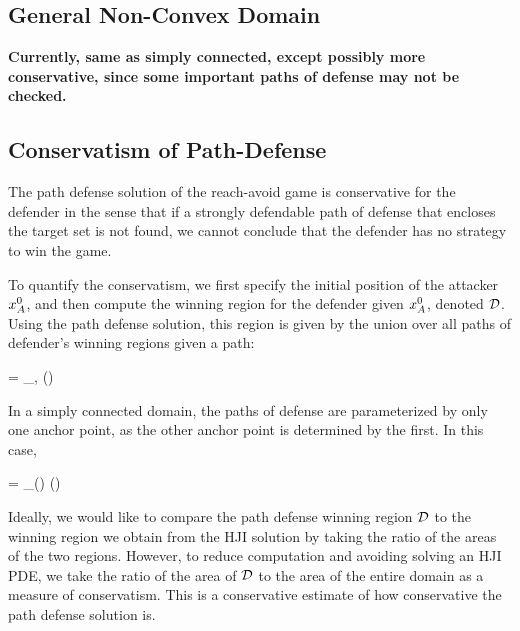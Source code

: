 \subsection{General Non-Convex Domain}
\textbf{Currently, same as simply connected, except possibly more conservative, since some important paths of defense may not be checked.}

\subsection{Conservatism of Path-Defense}
The path defense solution of the reach-avoid game is conservative for the defender in the sense that if a strongly defendable path of defense that encloses the target set is not found, we cannot conclude that the defender has no strategy to win the game. 

To quantify the conservatism, we first specify the initial position of the attacker $x_A^0$, and then compute the winning region for the defender given $x_A^0$, denoted $\mathcal{D}$. Using the path defense solution, this region is given by the union over all paths of defender's winning regions given a path:

\bq
\wrd = \bigcup_{\apa,\apb} (\rpd)
\eq

In a simply connected domain, the paths of defense are parameterized by only one anchor point, as the other anchor point is determined by the first. In this case, 

\bq
\wrd = \bigcup_{\apa(\apb)} (\rpd)
\eq

Ideally, we would like to compare the path defense winning region $\mathcal{D}$ to the winning region we obtain from the HJI solution by taking the ratio of the areas of the two regions. However, to reduce computation and avoiding solving an HJI PDE, we take the ratio of the area of $\mathcal{D}$ to the area of the entire domain as a measure of conservatism. This is a conservative estimate of how conservative the path defense solution is.
